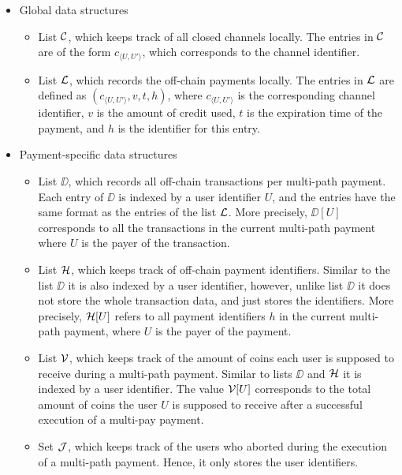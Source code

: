 \begin{itemize}
	\item Global data structures
	\begin{itemize}
		\item List $\mathcal{C}$, which keeps track of all closed channels locally. The entries in $\mathcal{C}$ 
		are of the form $c_{\langle U,U' \rangle}$, which corresponds to the channel identifier.
		\item List $\mathcal{L}$, which records the off-chain payments locally. The entries in $\mathcal{L}$ are 
		defined as $(c_{\langle U,U' \rangle}, v, t, h)$, where $c_{\langle U,U' \rangle}$ is the 
		corresponding channel identifier, $v$ is the amount of credit used, $t$ is the expiration 
		time of the payment, and $h$ is the identifier for this entry.
	\end{itemize}
	
	\item Payment-specific data structures
	\begin{itemize}
		\item List $\DD$, which records all off-chain transactions per multi-path payment. Each 
		entry of $\DD$ is indexed by a user identifier $U$, and the entries have the same format 
		as the entries of the list $\mathcal{L}$. More precisely, $\DD[U]$ corresponds to all the 
		transactions in the current multi-path payment where $U$ is the payer of the transaction. 
		\item List $\mathcal{H}$, which keeps track of off-chain payment identifiers. Similar to the list 
		$\DD$ it is also indexed by a user identifier, however, unlike list $\DD$ it does not 
		store the whole transaction data, and just stores the identifiers. More precisely, 
		$\mathcal{H}[U]$ refers to all payment identifiers $h$ in the current multi-path payment, where 
		$U$ is the payer of the payment.
	 
		\item List $\mathcal{V}$, which keeps track of the amount of coins each user is supposed to 
		receive during a multi-path payment. Similar to lists $\DD$ and $\mathcal{H}$ it is indexed 
		by a user identifier. The value $\mathcal{V}[U]$ corresponds to the total amount of coins the 
		user $U$ is supposed to receive after a successful execution of a multi-pay payment.
		\item Set $\mathcal{J}$, which keeps track of the users who aborted during the execution of 
		a multi-path payment. Hence, it only stores the user identifiers.
	\end{itemize}
\end{itemize}
	
